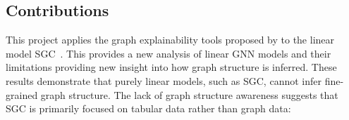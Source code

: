 %
%

\subsection{Contributions}

This project applies the graph explainability tools proposed by \citet{magister2021gcexplainer} to the linear model SGC~\cite{wu2019simplifying}.
This provides a new analysis of linear GNN models and their limitations providing new insight into how graph structure is inferred.
These results demonstrate that purely linear models, such as SGC, cannot infer fine-grained graph structure.
The lack of graph structure awareness suggests that SGC is primarily focused on tabular data rather than graph data:

